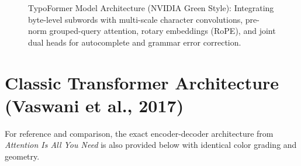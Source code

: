 \documentclass[11pt,a4paper]{article}
\begin{document}
\begin{figure}[htbp]
\caption{TypoFormer Model Architecture (NVIDIA Green Style): Integrating byte-level subwords with multi-scale character convolutions, pre-norm grouped-query attention, rotary embeddings (RoPE), and joint dual heads for autocomplete and grammar error correction.}
\label{fig:typoformer}
\end{figure}

\newpage
\section{Classic Transformer Architecture (Vaswani et al., 2017)}
For reference and comparison, the exact encoder-decoder architecture from \textit{Attention Is All You Need} is also provided below with identical color grading and geometry.
\end{document}

